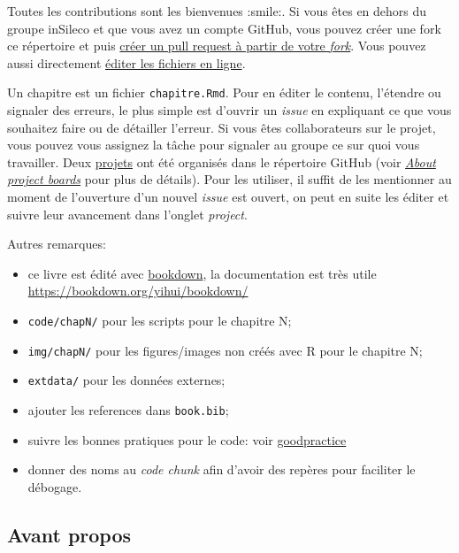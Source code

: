 \documentclass[]{article}
\providecommand{\tightlist}{%
  \setlength{\itemsep}{0pt}\setlength{\parskip}{0pt}}
\begin{document}
Toutes les contributions sont les bienvenues :smile:. Si vous êtes en dehors du
groupe inSileco et que vous avez un compte GitHub, vous pouvez créer une fork ce
répertoire et puis \href{https://help.github.com/articles/creating-a-pull-request-from-a-fork/}{créer un pull request à partir de votre
\emph{fork}}.
Vous pouvez aussi directement \href{https://help.github.com/articles/editing-files-in-another-user-s-repository/}{éditer les fichiers en
ligne}.

Un chapitre est un fichier \texttt{chapitre.Rmd}. Pour en éditer le contenu, l'étendre ou signaler des erreurs, le plus simple est d'ouvrir un \emph{issue} en expliquant ce que vous souhaitez faire ou de détailler l'erreur. Si vous êtes collaborateurs sur le projet, vous pouvez vous assignez la tâche pour signaler au groupe ce sur quoi vous travailler.
Deux \href{https://github.com/inSileco/VisualiseR/projects}{projets} ont été organisés dans le répertoire GitHub (voir \href{https://help.github.com/articles/about-project-boards/}{\emph{About project boards}} pour plus de détails). Pour les utiliser, il suffit de les mentionner au moment de l'ouverture d'un nouvel \emph{issue} est ouvert, on peut en suite les éditer et suivre leur avancement dans l'onglet \emph{project}.

Autres remarques:

\begin{itemize}
\tightlist
\item
  ce livre est édité avec \href{https://github.com/rstudio/bookdownw/}{bookdown}, la documentation est très utile \url{https://bookdown.org/yihui/bookdown/}
\item
  \texttt{code/chapN/} pour les scripts pour le chapitre N;
\item
  \texttt{img/chapN/} pour les figures/images non créés avec R pour le chapitre N;
\item
  \texttt{extdata/} pour les données externes;
\item
  ajouter les references dans \texttt{book.bib};
\item
  suivre les bonnes pratiques pour le code: voir \href{https://github.com/MangoTheCat/goodpractice}{goodpractice}
\item
  donner des noms au \emph{code chunk} afin d'avoir des repères pour faciliter le débogage.
\end{itemize}

\hypertarget{avant-propos}{%
\subsection*{Avant propos}\label{avant-propos}}
\end{document}
